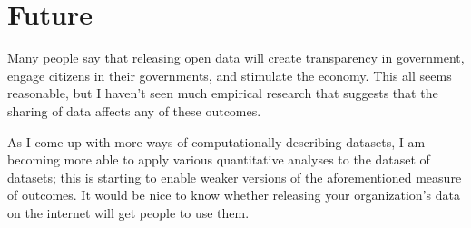 \documentclass{acm_proc_article-sp}
\begin{document}
\section{Future}
Many people say that releasing open data will create transparency in government,
engage citizens in their governments, and stimulate the economy. This all seems
reasonable, but I haven't seen much empirical research that suggests that the
sharing of data affects any of these outcomes.

As I come up with more ways of computationally describing datasets, I am becoming
more able to apply various quantitative analyses to the dataset of datasets;
this is starting to enable weaker versions of the aforementioned measure of
outcomes. It would be nice to know whether releasing your organization's data on
the internet will get people to use them.



\balancecolumns
\end{document}
